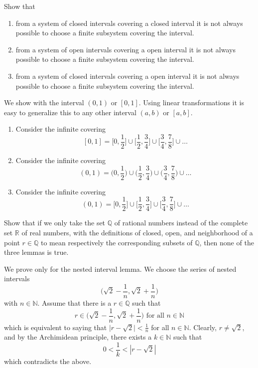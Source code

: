 \documentclass{article}
\begin{document}
    \begin{exercise}[Zorich 2.3.2]
    Show that 
    \begin{enumerate}
        \item from a system of closed intervals covering a closed interval it is not always possible to choose a finite subsystem covering the interval. 
        \item from a system of open intervals covering a open interval it is not always possible to choose a finite subsystem covering the interval. 
        \item from a system of closed intervals covering a open interval it is not always possible to choose a finite subsystem covering the interval. 
    \end{enumerate}
    \end{exercise}

    \begin{solution}
    We show with the interval $(0, 1)$ or $[0, 1]$. Using linear transformations it is easy to generalize this to any other interval $(a, b)$ or $[a, b]$. 
    \begin{enumerate}
        \item Consider the infinite covering
        \[[0, 1] = \big[0, \frac{1}{2}\big] \cup \big[\frac{1}{2}, \frac{3}{4}\big] \cup \big[\frac{3}{4}, \frac{7}{8}\big] \cup \ldots \]
        \item Consider the infinite covering 
        \[(0, 1) = \big(0, \frac{1}{2}\big) \cup \big(\frac{1}{2}, \frac{3}{4}\big) \cup \big(\frac{3}{4}, \frac{7}{8}\big) \cup \ldots \]
        \item Consider the infinite covering 
        \[(0, 1) = \big[0, \frac{1}{2}\big] \cup \big[\frac{1}{2}, \frac{3}{4}\big] \cup \big[\frac{3}{4}, \frac{7}{8}\big] \cup \ldots \]
    \end{enumerate}
    \end{solution}

    \begin{exercise}[Zorich 2.3.3]
    Show that if we only take the set $\mathbb{Q}$ of rational numbers instead of the complete set $\mathbb{R}$ of real numbers, with the definitions of closed, open, and neighborhood of a point $r \in \mathbb{Q}$ to mean respectively the corresponding subsets of $\mathbb{Q}$, then none of the three lemmas is true. 
    \end{exercise}

    \begin{solution}
    We prove only for the nested interval lemma. We choose the series of nested intervals 
    \[\bigg( \sqrt{2} - \frac{1}{n}, \sqrt{2} + \frac{1}{n} \bigg)\]
    with $n \in \mathbb{N}$. Assume that there is a $r \in \mathbb{Q}$ such that 
    \[r \in \bigg( \sqrt{2} - \frac{1}{n}, \sqrt{2} + \frac{1}{n} \bigg) \text{ for all } n \in \mathbb{N}\]
    which is equivalent to saying that $\big| r - \sqrt{2}\big| < \frac{1}{n}$ for all $n \in \mathbb{N}$. Clearly, $r \neq \sqrt{2}$, and by the Archimidean principle, there exists a $k \in \mathbb{N}$ such that 
    \[0 < \frac{1}{k} < |r - \sqrt{2}|\]
    which contradicts the above. 
    \end{solution}
\end{document}
